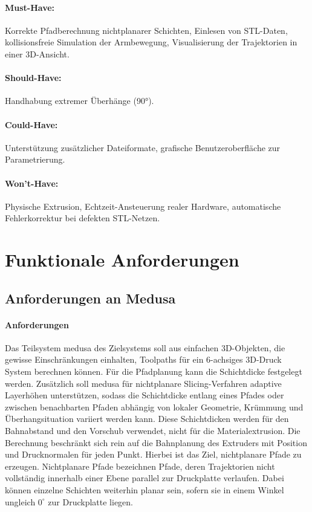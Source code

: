             \paragraph{Must-Have:}
            Korrekte Pfadberechnung nichtplanarer Schichten,
            Einlesen von \ac{STL}-Daten,
            kollisionsfreie Simulation der Armbewegung,
            Visualisierung der Trajektorien in einer 3D-Ansicht.
            \paragraph{Should-Have:} Handhabung extremer Überhänge (90°).
            \paragraph{Could-Have:} Unterstützung zusätzlicher Dateiformate, grafische Benutzeroberfläche zur Parametrierung.
            \paragraph{Won't-Have:} Physische Extrusion, Echtzeit-Ansteuerung realer Hardware, automatische Fehlerkorrektur bei defekten \ac{STL}-Netzen.

    \section{Funktionale Anforderungen}\label{sec:functional-requirements}
        \subsection{Anforderungen an Medusa}\label{subsec:medusa-requirements}

            \paragraph{Anforderungen}
            Das Teilsystem \ac{medusa} des Zielsystems soll aus einfachen 3D-Objekten, die gewisse Einschränkungen einhalten,
            Toolpaths für ein 6-achsiges 3D-Druck System berechnen können.
            Für die Pfadplanung kann die Schichtdicke festgelegt werden.
            Zusätzlich soll \ac{medusa} für nichtplanare Slicing-Verfahren adaptive Layerhöhen unterstützen,
            sodass die Schichtdicke entlang eines Pfades oder zwischen benachbarten Pfaden abhängig von lokaler Geometrie,
            Krümmung und Überhangsituation variiert werden kann.
            Diese Schichtdicken werden für den Bahnabstand und den Vorschub verwendet, nicht für die Materialextrusion. 
            Die Berechnung beschränkt sich rein auf die Bahnplanung des Extruders mit Position und Drucknormalen für jeden Punkt.
            Hierbei ist das Ziel, nichtplanare Pfade zu erzeugen.
            Nichtplanare Pfade bezeichnen Pfade, deren Trajektorien nicht vollständig innerhalb einer Ebene parallel zur Druckplatte verlaufen.
            Dabei können einzelne Schichten weiterhin planar sein, sofern sie in einem Winkel ungleich $0^\circ$ zur Druckplatte liegen.
            

